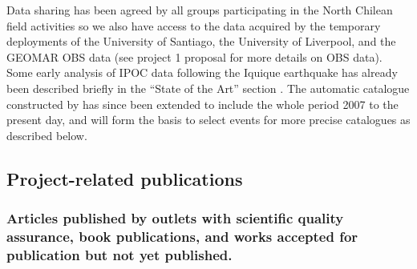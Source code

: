 \documentclass[11pt]{article}
\providecommand{\currfilename}{}
\newcommand{\showfile}{{\bf \tt \color{blue} \currfilename}}
\newcommand{\note}[1]{{\it \color{red} #1}}
\newcommand{\noteft}[1]{{\it \color{magenta} FT:#1}}
\newcommand{\note}[1]{}
\newcommand{\noteft}[1]{}
\newcommand{\showfile}{}
\begin{document}
Data sharing has been agreed by all groups participating in the North Chilean field activities so we also have access to the data acquired by the temporary deployments of the University of Santiago, the University of Liverpool, and the GEOMAR OBS data (see project 1 proposal for more details on OBS data). Some early analysis of IPOC data following the Iquique earthquake has already been described briefly in the ``State of the Art'' section \citep[and Gassenmeier et al., in preparation]{schurr2014}. The automatic catalogue constructed by \citet{schurr2014} has since been extended to include the whole period 2007 to the present day, and will form the basis to select events for more precise catalogues as described below.









\subsection{Project-related publications}
\subsubsection{Articles published by outlets with scientific quality assurance, book publications, and works accepted for publication but not yet published.}
\showfile

\end{document}

